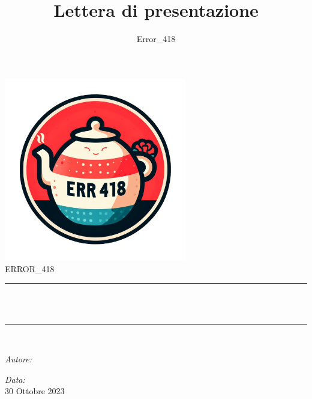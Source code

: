 \documentclass[a4paper, twoside]{article}
\title{\Huge Lettera di presentazione}
\author{Error\_418}
\newcommand{\HRule}{\rule{\linewidth}{0.5mm}}
\begin{document}
\sffamily
\begin{titlepage}
\centering
\includegraphics[width=8cm]{logo.png}\\[1.5cm]
\center %
\textsf{\Huge ERROR\_418}\\[2cm]
\makeatletter
\HRule \\[0.4cm]
{ \huge \bfseries \@title}\\[0.4cm]
\HRule \\[1.5cm]
\begin{minipage}{0.4\textwidth}
\begin{flushleft} \large
\emph{Autore:}\\
\@author %
\end{flushleft}
\end{minipage}
\begin{minipage}{0.4\textwidth}
\begin{flushright} \large
\emph{Data:}\\
{\large 30 Ottobre 2023}\\[1cm]
\end{flushright}
\end{minipage}


\end{titlepage}
\end{document}
